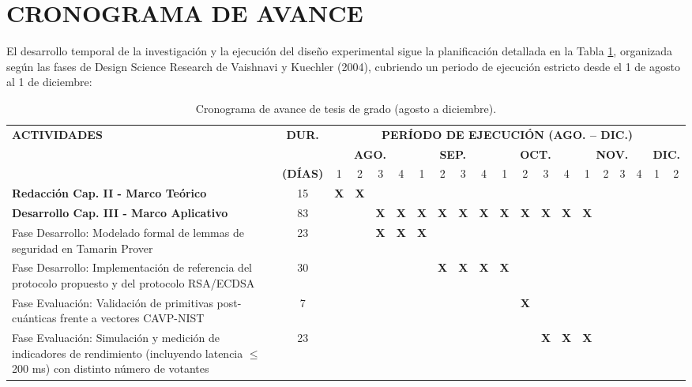 \section{CRONOGRAMA DE AVANCE}
El desarrollo temporal de la investigación y la ejecución del diseño experimental sigue la planificación detallada en la Tabla \ref{tab:cronograma}, organizada según las fases de Design Science Research de Vaishnavi y Kuechler (2004), cubriendo un periodo de ejecución estricto desde el 1 de agosto al 1 de diciembre:
\begin{table}[H]
	\centering
	\caption{Cronograma de avance de tesis de grado (agosto a  diciembre).}
	\label{tab:cronograma}
	\renewcommand{\arraystretch}{1.3}
	\setlength{\tabcolsep}{1.8pt}
	\fontsize{7}{8.5}\selectfont
	\begin{tabular}{|p{4.4cm}|c|c|c|c|c|c|c|c|c|c|c|c|c|c|c|c|c|c|c|}
		\hline
		\multirow{2}{*}{\textbf{ACTIVIDADES}} & \multirow{2}{*}{\textbf{DUR.}} & \multicolumn{18}{c|}{\textbf{PERÍODO DE EJECUCIÓN (AGO. -- DIC.)}} \\
		& & \multicolumn{4}{c|}{\textbf{AGO.}} & \multicolumn{4}{c|}{\textbf{SEP.}} & \multicolumn{4}{c|}{\textbf{OCT.}} & \multicolumn{4}{c|}{\textbf{NOV.}} & \multicolumn{2}{c|}{\textbf{DIC.}} \\
		\cline{3-20}
		& \textbf{(DÍAS)} & 1 & 2 & 3 & 4 & 1 & 2 & 3 & 4 & 1 & 2 & 3 & 4 & 1 & 2 & 3 & 4 & 1 & 2 \\
		\hline
		\textbf{Redacción Cap. II - Marco Teórico} & 15 & \textbf{X} & \textbf{X} & & & & & & & & & & & & & & & & \\
		\hline
		\textbf{Desarrollo Cap. III - Marco Aplicativo} & 83 & & & \textbf{X} & \textbf{X} & \textbf{X} & \textbf{X} & \textbf{X} & \textbf{X} & \textbf{X} & \textbf{X} & \textbf{X} & \textbf{X} & \textbf{X} & & & & & \\
		\hline
		\quad Fase Desarrollo: Modelado formal de lemmas de seguridad en Tamarin Prover & 23 & & & \textbf{X} & \textbf{X} & \textbf{X} & & & & & & & & & & & & & \\
		\hline
		\quad Fase Desarrollo: Implementación de referencia del protocolo propuesto y del protocolo RSA/ECDSA & 30 & & & & & & \textbf{X} & \textbf{X} & \textbf{X} & \textbf{X} & & & & & & & & & \\
		\hline
		\quad Fase Evaluación: Validación de primitivas post-cuánticas frente a vectores CAVP-NIST & 7 & & & & & & & & & & \textbf{X} & & & & & & & & \\
		\hline
		\quad Fase Evaluación: Simulación y medición de indicadores de rendimiento (incluyendo latencia $\le$ 200 ms) con distinto número de votantes & 23 & & & & & & & & & & & \textbf{X} & \textbf{X} & \textbf{X} & & & & & \\

\end{tabular}
\end{table}
